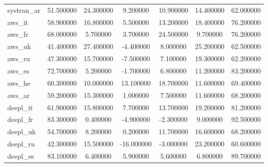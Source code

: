 \begin{tabular}{lcccccc}
systran_ar & 51.500000 & 24.300000 & 9.200000 & 10.900000 & 14.400000 & 62.000000 \\
aws_it & 58.900000 & 16.800000 & 5.500000 & 13.200000 & 18.400000 & 76.200000 \\
aws_fr & 68.000000 & 5.700000 & 3.700000 & 24.500000 & 9.700000 & 76.200000 \\
aws_uk & 41.400000 & 27.400000 & -4.400000 & 8.000000 & 25.200000 & 62.500000 \\
aws_ru & 47.300000 & 15.700000 & -7.500000 & 7.100000 & 19.300000 & 62.200000 \\
aws_es & 72.700000 & 5.200000 & -1.700000 & 6.800000 & 11.200000 & 83.200000 \\
aws_he & 60.300000 & 10.000000 & 13.100000 & 18.700000 & 11.600000 & 69.400000 \\
aws_ar & 59.200000 & 15.300000 & 1.000000 & 7.500000 & 11.600000 & 68.200000 \\
deepl_it & 61.900000 & 15.800000 & 7.700000 & 13.700000 & 19.200000 & 81.200000 \\
deepl_fr & 83.300000 & 0.400000 & -4.900000 & -2.300000 & 9.000000 & 92.500000 \\
deepl_uk & 54.700000 & 8.200000 & 0.200000 & 11.700000 & 16.600000 & 68.200000 \\
deepl_ru & 42.300000 & 15.500000 & -16.000000 & -3.000000 & 23.200000 & 60.600000 \\
deepl_es & 83.100000 & 6.400000 & 5.900000 & 5.600000 & 6.800000 & 89.700000 \\
\bottomrule
\end{tabular}
